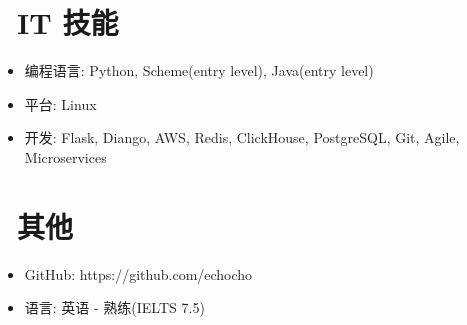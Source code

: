 \documentclass{resume}
\begin{document}

\section{\faCogs\ IT 技能}
\begin{itemize}[parsep=0.5ex]
  \item 编程语言: Python, Scheme(entry level), Java(entry level)
  \item 平台: Linux
  \item 开发: Flask, Diango, AWS, Redis, ClickHouse, PostgreSQL, Git, Agile, Microservices
\end{itemize}


\section{\faInfo\ 其他}
\begin{itemize}[parsep=0.5ex]
  \item GitHub: https://github.com/echocho
  \item 语言: 英语 - 熟练(IELTS 7.5)
\end{itemize}

%
%
\end{document}
